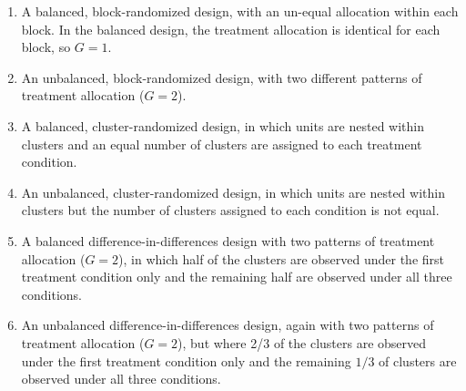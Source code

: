 \documentclass[12pt]{article}
\begin{document}
\begin{enumerate}
\item A balanced, block-randomized design, with an un-equal allocation within each block. In the balanced design, the treatment allocation is identical for each block, so $G = 1$.
\item An unbalanced, block-randomized design, with two different patterns of treatment allocation ($G = 2$).
\item A balanced, cluster-randomized design, in which units are nested within clusters and an equal number of clusters are assigned to each treatment condition.
\item An unbalanced, cluster-randomized design, in which units are nested within clusters but the number of clusters assigned to each condition is not equal. 
\item A balanced difference-in-differences design with two patterns of treatment allocation ($G = 2$), in which half of the clusters are observed under the first treatment condition only and the remaining half are observed under all three conditions.
\item An unbalanced difference-in-differences design, again with two patterns of treatment allocation ($G = 2$), but where 2/3 of the clusters are observed under the first treatment condition only and the remaining $1 / 3$ of clusters are observed under all three conditions.
\end{enumerate}
\end{document}
